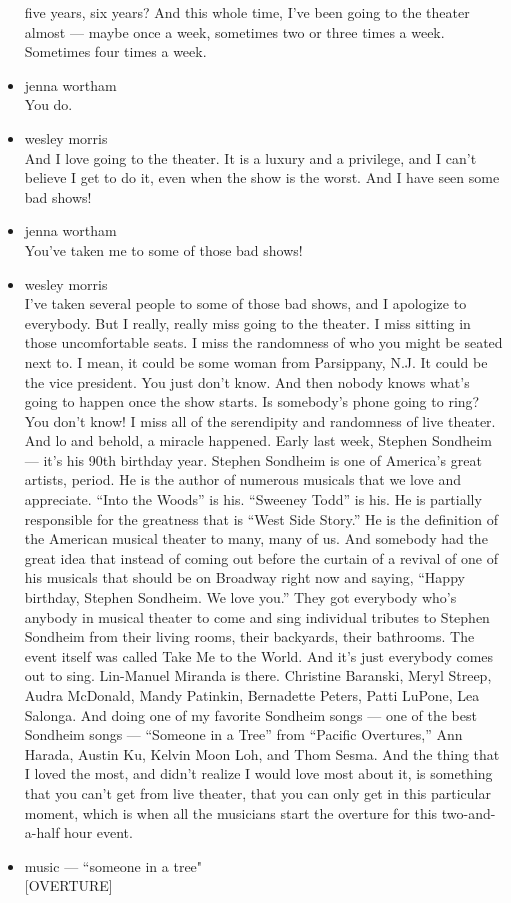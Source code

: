 \begin{itemize}
  five years, six years? And this whole time, I've been going to the
  theater almost --- maybe once a week, sometimes two or three times a
  week. Sometimes four times a week.
\item
  jenna wortham\\
  You do.
\item
  wesley morris\\
  And I love going to the theater. It is a luxury and a privilege, and I
  can't believe I get to do it, even when the show is the worst. And I
  have seen some bad shows!
\item
  jenna wortham\\
  You've taken me to some of those bad shows!
\item
  wesley morris\\
  I've taken several people to some of those bad shows, and I apologize
  to everybody. But I really, really miss going to the theater. I miss
  sitting in those uncomfortable seats. I miss the randomness of who you
  might be seated next to. I mean, it could be some woman from
  Parsippany, N.J. It could be the vice president. You just don't know.
  And then nobody knows what's going to happen once the show starts. Is
  somebody's phone going to ring? You don't know! I miss all of the
  serendipity and randomness of live theater. And lo and behold, a
  miracle happened. Early last week, Stephen Sondheim --- it's his 90th
  birthday year. Stephen Sondheim is one of America's great artists,
  period. He is the author of numerous musicals that we love and
  appreciate. ``Into the Woods'' is his. ``Sweeney Todd'' is his. He is
  partially responsible for the greatness that is ``West Side Story.''
  He is the definition of the American musical theater to many, many of
  us. And somebody had the great idea that instead of coming out before
  the curtain of a revival of one of his musicals that should be on
  Broadway right now and saying, ``Happy birthday, Stephen Sondheim. We
  love you.'' They got everybody who's anybody in musical theater to
  come and sing individual tributes to Stephen Sondheim from their
  living rooms, their backyards, their bathrooms. The event itself was
  called Take Me to the World. And it's just everybody comes out to
  sing. Lin-Manuel Miranda is there. Christine Baranski, Meryl Streep,
  Audra McDonald, Mandy Patinkin, Bernadette Peters, Patti LuPone, Lea
  Salonga. And doing one of my favorite Sondheim songs --- one of the
  best Sondheim songs --- ``Someone in a Tree'' from ``Pacific
  Overtures,'' Ann Harada, Austin Ku, Kelvin Moon Loh, and Thom Sesma.
  And the thing that I loved the most, and didn't realize I would love
  most about it, is something that you can't get from live theater, that
  you can only get in this particular moment, which is when all the
  musicians start the overture for this two-and-a-half hour event.
\item
  music --- ``someone in a tree"\\
  {[}OVERTURE{]}
\end{itemize}

